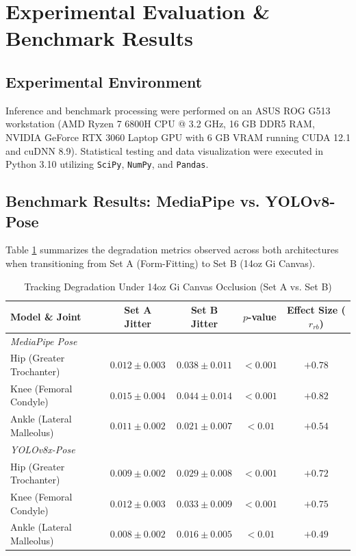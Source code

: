\section{Experimental Evaluation \& Benchmark Results}
\label{sec:experiments}

\subsection{Experimental Environment}
Inference and benchmark processing were performed on an ASUS ROG G513 workstation (AMD Ryzen 7 6800H CPU @ 3.2 GHz, 16 GB DDR5 RAM, NVIDIA GeForce RTX 3060 Laptop GPU with 6 GB VRAM running CUDA 12.1 and cuDNN 8.9). Statistical testing and data visualization were executed in Python 3.10 utilizing \texttt{SciPy}, \texttt{NumPy}, and \texttt{Pandas}.

\subsection{Benchmark Results: MediaPipe vs. YOLOv8-Pose}

Table \ref{tab:benchmark_results} summarizes the degradation metrics observed across both architectures when transitioning from Set A (Form-Fitting) to Set B (14oz Gi Canvas).

\begin{table}[h]
\centering
\caption{Tracking Degradation Under 14oz Gi Canvas Occlusion (Set A vs. Set B)}
\label{tab:benchmark_results}
\small
\begin{tabular}{lcccc}
\hline
\textbf{Model \& Joint} & \textbf{Set A Jitter} & \textbf{Set B Jitter} & \textbf{$p$-value} & \textbf{Effect Size ($r_{rb}$)} \\
\hline
\textit{MediaPipe Pose} & & & & \\
Hip (Greater Trochanter) & $0.012 \pm 0.003$ & $0.038 \pm 0.011$ & $<0.001$ & $+0.78$ \\
Knee (Femoral Condyle) & $0.015 \pm 0.004$ & $0.044 \pm 0.014$ & $<0.001$ & $+0.82$ \\
Ankle (Lateral Malleolus)& $0.011 \pm 0.002$ & $0.021 \pm 0.007$ & $<0.01$  & $+0.54$ \\
\hline
\textit{YOLOv8x-Pose} & & & & \\
Hip (Greater Trochanter) & $0.009 \pm 0.002$ & $0.029 \pm 0.008$ & $<0.001$ & $+0.72$ \\
Knee (Femoral Condyle) & $0.012 \pm 0.003$ & $0.033 \pm 0.009$ & $<0.001$ & $+0.75$ \\
Ankle (Lateral Malleolus)& $0.008 \pm 0.002$ & $0.016 \pm 0.005$ & $<0.01$  & $+0.49$ \\
\hline
\end{tabular}
\end{table}

